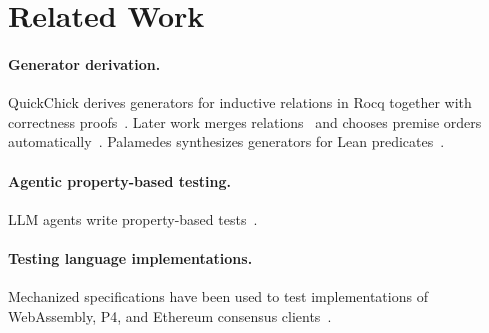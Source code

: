 \section{Related Work}
\label{sec:related}

\paragraph{Generator derivation.}
QuickChick derives generators for inductive relations in Rocq together with
correctness
proofs~\cite{paraskevopoulou15foundational,lampropoulos18generators,paraskevopoulou22computing}.
Later work merges relations~\cite{prinz23merging} and chooses premise orders
automatically~\cite{mittelman26testing}.
Palamedes synthesizes generators for Lean predicates~\cite{goldstein26palamedes}.

\paragraph{Agentic property-based testing.}
LLM agents write property-based tests~\cite{maaz25agentic,lee26propertytemplates}.

\paragraph{Testing language implementations.}
Mechanized specifications have been used to test implementations of
WebAssembly, P4, and Ethereum consensus
clients~\cite{youn25west,lee26fwp,jeong26spectrum}.
